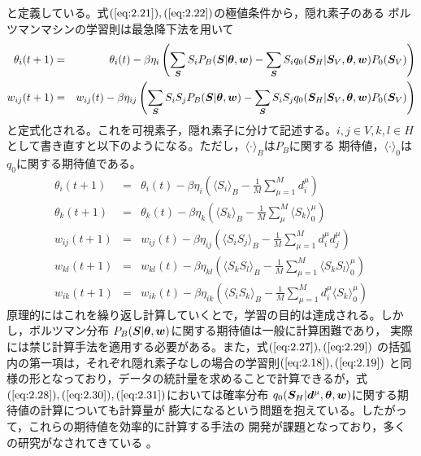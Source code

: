 と定義している。式$(\ref{eq:2.21}),(\ref{eq:2.22})$の極値条件から，隠れ素子のある
ボルツマンマシンの学習則は最急降下法を用いて
\begin{eqnarray}
\theta_{i}(t+1)&=&\theta_{i}(t)-\beta\eta_{i}
\left(\sum_{\bm{S}}S_{i}P_{B}(\bm{S}|\boldsymbol{\theta},\bm{w})
-\sum_{\bm{S}}S_{i}q_{0}(\bm{S}_{H}|\bm{S}_{V},\boldsymbol{\theta},\bm{w})P_{0}(\bm{S}_{V})\right)
\label{eq:2.5}\\
w_{ij}(t+1)&=&w_{ij}(t)-\beta\eta_{ij}\left(
\sum_{\bm{S}}S_{i}S_{j}P_{B}(\bm{S}|\boldsymbol{\theta},\bm{w})
-\sum_{\bm{S}}S_{i}S_{j}q_{0}(\bm{S}_{H}|\bm{S}_{V},\boldsymbol{\theta},
\bm{w})P_{0}(\bm{S}_{V})\right)\label{eq:2.26}
\end{eqnarray}
と定式化される。これを可視素子，隠れ素子に分けて記述する。$i,j\in V, k,l\in H$
として書き直すと以下のようになる。ただし，$\langle\cdot\rangle_{B}$は$P_{B}$に関する
期待値，$\langle\cdot\rangle_{0}$は$q_{0}$に関する期待値である。
\begin{eqnarray}
\theta_{i}(t+1)&=&\theta_{i}(t)-\beta\eta_{i}\left(\langle
S_{i}\rangle_{B}-\frac{1}{M}\sum_{\mu=1}^{M}d_{i}^{\mu}\right)\label{eq:2.27}\\
\theta_{k}(t+1)&=&\theta_{k}(t)-\beta\eta_{k}\left(
\langle S_{k}\rangle_{B}-\frac{1}{M}\sum_{\mu}^{M}\langle
S_{k}\rangle_{0}^{\mu}\right)\label{eq:2.28}\\
w_{ij}(t+1)&=&w_{ij}(t)-\beta\eta_{ij}\left(
\langle S_{i}S_{j}\rangle_{B}
-\frac{1}{M}\sum_{\mu=1}^{M}d_{i}^{\mu}d_{j}^{\mu}\right)\label{eq:2.29}\\
w_{kl}(t+1)&=&w_{kl}(t)-\beta\eta_{kl}\left(
\langle S_{k}S_{l}\rangle_{B}-\frac{1}{M}\sum_{\mu=1}^{M}\langle
S_{k}S_{l}\rangle_{0}^{\mu} \right)\label{eq:2.30}\\
w_{ik}(t+1)&=&w_{ik}(t)-\beta\eta_{ik}\left(
\langle S_{i}S_{k}\rangle_{B}-\frac{1}{M}\sum_{\mu=1}^{M}d_{i}^{\mu}
\langle S_{k}\rangle_{0}^{\mu}\right)\label{eq:2.31}
\end{eqnarray}
原理的にはこれを繰り返し計算していくとで，学習の目的は達成される。しかし，ボルツマン分布
$P_{B}(\bm{S}|\boldsymbol{\theta},\bm{w})$に関する期待値は一般に計算困難であり，
実際には禁じ計算手法を適用する必要がある。また，式$(\ref{eq:2.27}),(\ref{eq:2.29})$
の括弧内の第一項は，それぞれ隠れ素子なしの場合の学習則$(\ref{eq:2.18}),(\ref{eq:2.19})$
と同様の形となっており，データの統計量を求めることで計算できるが，式
$(\ref{eq:2.28}),(\ref{eq:2.30}),(\ref{eq:2.31})$においては確率分布
$q_{0}(\bm{S}_{H}|\bm{d}^{\mu},\boldsymbol{\theta},\bm{w})$に関する期待値の計算についても計算量が
膨大になるという問題を抱えている。したがって，これらの期待値を効率的に計算する手法の
開発が課題となっており，多くの研究がなされてきている\cite{jordan1998learning}
\cite{jordan2001graphical}\cite{Yasuda200683}。

